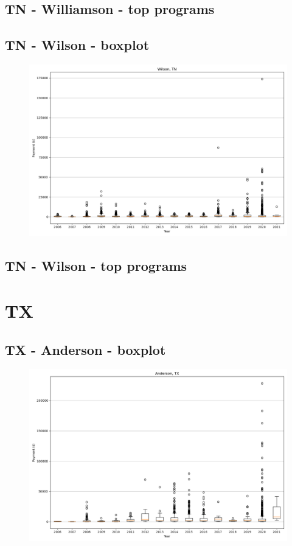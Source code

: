 \subsection*{TN - Williamson - top programs}

\newpage
\subsection*{TN - Wilson - boxplot}
\begin{figure}[h]
\centering
\includegraphics[width=7in]{../output/boxplots/counties/Wilson-TN_boxplot.png}
\end{figure}


\subsection*{TN - Wilson - top programs}

\newpage
\section*{TX}
\subsection*{TX - Anderson - boxplot}
\begin{figure}[h]
\centering
\includegraphics[width=7in]{../output/boxplots/counties/Anderson-TX_boxplot.png}
\end{figure}


